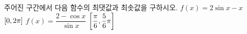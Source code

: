 주어진 구간에서 다음 함수의 최댓값과 최솟값을 구하시오.
 $f(x)=2\sin x-x$ $[0{,}\mkern3mu\mathopen{}2\pi]$
 $f(x)=\dfrac{2-\cos x}{\sin x}$ $\left[\dfrac{\pi}{6}{,}\mkern3mu\mathopen{}\dfrac{5}{6}\pi\right]$
